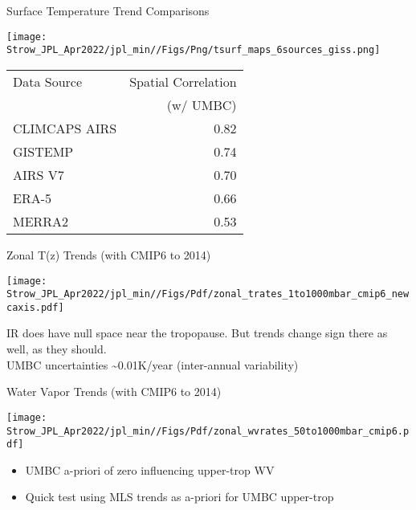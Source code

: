 \documentclass[10pt,t]{beamer}
\begin{document}
\begin{frame}[label={sec:orge4ee1be}]{Surface Temperature Trend Comparisons}
\vspace{-0.15in}
\begin{center}
\texttt{[image: Strow\_JPL\_Apr2022/jpl\_min//Figs/Png/tsurf\_maps\_6sources\_giss.png]}
\end{center}

\vspace{0.1in}
\footnotesize
\begin{center}
\begin{tabular}{lr}
\hline
Data Source & Spatial Correlation\\
 & (w/ UMBC)\\
\hline
CLIMCAPS AIRS & 0.82\\
GISTEMP & 0.74\\
AIRS V7 & 0.70\\
ERA-5 & 0.66\\
MERRA2 & 0.53\\
\hline
\end{tabular}
\end{center}
\end{frame}

\begin{frame}[label={sec:org4c23670}]{Zonal T(z) Trends (with CMIP6 to 2014)}
\vspace{-0.15in}
\begin{center}
\texttt{[image: Strow\_JPL\_Apr2022/jpl\_min//Figs/Pdf/zonal\_trates\_1to1000mbar\_cmip6\_newcaxis.pdf]}
\end{center}

\footnotesize
IR does have null space near the tropopause.  But trends change sign there as well, as they should.\\
\vspace{0.1in}
UMBC uncertainties \textasciitilde{}0.01K/year (inter-annual variability)
\end{frame}

\begin{frame}[label={sec:org459ac58}]{Water Vapor Trends (with CMIP6 to 2014)}
\vspace{-0.15in}
\begin{center}
\texttt{[image: Strow\_JPL\_Apr2022/jpl\_min//Figs/Pdf/zonal\_wvrates\_50to1000mbar\_cmip6.pdf]}
\end{center}

\small
\begin{itemize}
\item UMBC a-priori of zero influencing upper-trop WV
\item Quick test using MLS trends as a-priori for UMBC upper-trop
\end{itemize}
\end{frame}
\end{document}
